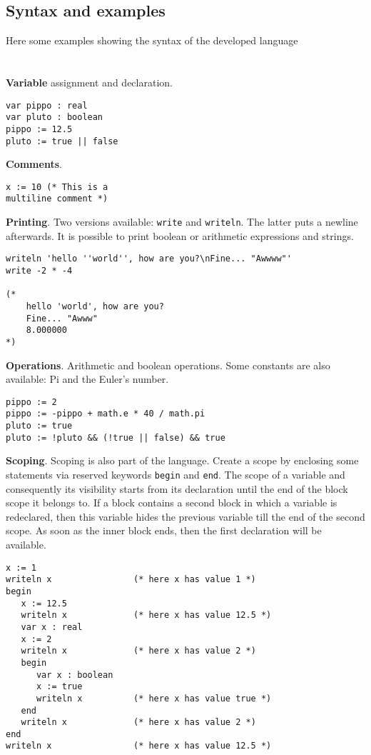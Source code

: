 \documentclass[12pt]{article}
\begin{document}
\subsection{Syntax and examples}
Here some examples showing the syntax of the developed language\\\\\\
\textbf{Variable} assignment and declaration.
\begin{lstlisting}[frame=single]
var pippo : real
var pluto : boolean
pippo := 12.5
pluto := true || false
\end{lstlisting}
\vspace{2cm}
\textbf{Comments}.
\begin{lstlisting}[frame=single]
x := 10 (* This is a
multiline comment *)
\end{lstlisting}
\pagebreak
\textbf{Printing}. Two versions available: \texttt{write} and \texttt{writeln}. The latter puts a newline afterwards. It is possible to print boolean or arithmetic expressions and strings.
\vspace{0.1cm}
\begin{lstlisting}[frame=single]
writeln	'hello ''world'', how are you?\nFine... "Awwww"'
write -2 * -4

(*
	hello 'world', how are you?
	Fine... "Awww"
	8.000000
*)
\end{lstlisting}
\vspace{2cm}
\textbf{Operations}. Arithmetic and boolean operations. Some constants are also available: Pi and the Euler's number.
\begin{lstlisting}[frame=single]
pippo := 2
pippo := -pippo + math.e * 40 / math.pi
pluto := true
pluto := !pluto && (!true || false) && true
\end{lstlisting}
\vspace{2cm}
\textbf{Scoping}. Scoping is also part of the language. Create a scope by enclosing some statements via reserved keywords \texttt{begin} and \texttt{end}. The scope of a variable and consequently its visibility starts from its declaration until the end of the block scope it belongs to. If a block contains a second block in which a variable is redeclared, then this variable hides the previous variable till the end of the second scope. As soon as the inner block ends, then the first declaration will be available.
\pagebreak
\begin{lstlisting}[frame=single]
x := 1
writeln x                (* here x has value 1 *)
begin
   x := 12.5
   writeln x             (* here x has value 12.5 *)
   var x : real
   x := 2
   writeln x             (* here x has value 2 *)
   begin
      var x : boolean
      x := true
      writeln x          (* here x has value true *)
   end
   writeln x             (* here x has value 2 *)
end
writeln x                (* here x has value 12.5 *)
\end{lstlisting}
\vspace{1.5cm}
\end{document}
